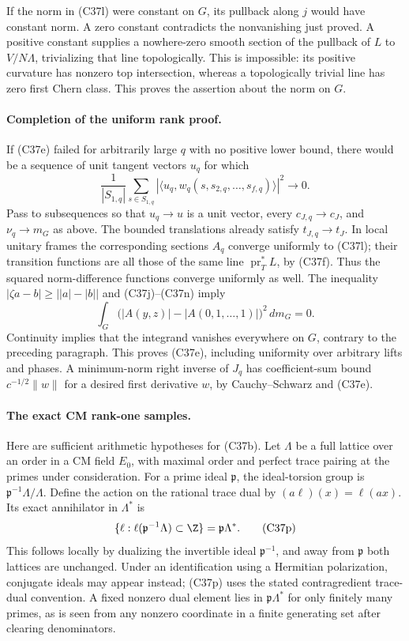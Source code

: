 If the norm in (C37l) were constant on $G$, its pullback along
$j$ would have constant norm.  A zero constant contradicts the
nonvanishing just proved.  A positive constant supplies a
nowhere-zero smooth section of the pullback of $L$ to
$V/N\Lambda$, trivializing that line topologically.  This is
impossible: its positive curvature has nonzero top intersection,
whereas a topologically trivial line has zero first Chern class.
This proves the assertion about the norm on $G$.

\paragraph{Completion of the uniform rank proof.}
If (C37e) failed for arbitrarily large $q$ with no positive lower
bound, there would be a sequence of unit tangent vectors $u_q$
for which
\[
  \frac1{|S_{1,q}|}\sum_{s\in S_{1,q}}
       |\langle u_q,w_q(s,s_{2,q},\ldots,s_{f,q})\rangle|^2
                  \longrightarrow0.
 \tag{C37n}
\]
Pass to subsequences so that $u_q\to u$ is a unit vector,
every $c_{J,q}\to c_J$, and $\nu_q\to m_G$ as above.
The bounded translations already satisfy $t_{J,q}\to t_J$.
In local unitary frames the corresponding sections $A_q$ converge
uniformly to (C37l); their transition functions are all those of
the same line $\operatorname{pr}_T^*L$, by (C37f).  Thus the
squared norm-difference functions converge uniformly as well.
The inequality $|\zeta a-b|\ge\bigl||a|-|b|\bigr|$ and
(C37j)--(C37n) imply
\[
       \int_G\bigl(|A(y,z)|-|A(0,1,\ldots,1)|\bigr)^2\,dm_G=0.
 \tag{C37o}
\]
Continuity implies that the integrand vanishes everywhere on
$G$, contrary to the preceding paragraph.  This proves (C37e),
including uniformity over arbitrary lifts and phases.  A
minimum-norm right inverse of $J_q$ has coefficient-sum bound
$c^{-1/2}\|w\|$ for a desired first derivative $w$, by
Cauchy--Schwarz and (C37e).

\paragraph{The exact CM rank-one samples.}
Here are sufficient arithmetic hypotheses for (C37b).  Let
$\Lambda$ be a full lattice over an order in a CM field $E_0$,
with maximal order and perfect trace pairing at the primes under
consideration.  For a prime ideal $\mathfrak p$, the ideal-torsion
group is $\mathfrak p^{-1}\Lambda/\Lambda$.  Define the action
on the rational trace dual by $(a\ell)(x)=\ell(ax)$.  Its exact
annihilator in $\Lambda^*$ is
\[
 \{\ell:\ell(\mathfrak p^{-1}\Lambda)\subset\Z\}
                        =\mathfrak p\Lambda^*.
 \tag{C37p}
\]
This follows locally by dualizing the invertible ideal
$\mathfrak p^{-1}$, and away from $\mathfrak p$ both lattices
are unchanged.  Under an identification using a Hermitian
polarization, conjugate ideals may appear instead; (C37p) uses
the stated contragredient trace-dual convention.  A fixed nonzero
dual element lies in $\mathfrak p\Lambda^*$ for only finitely
many primes, as is seen from any nonzero coordinate in a finite
generating set after clearing denominators.

